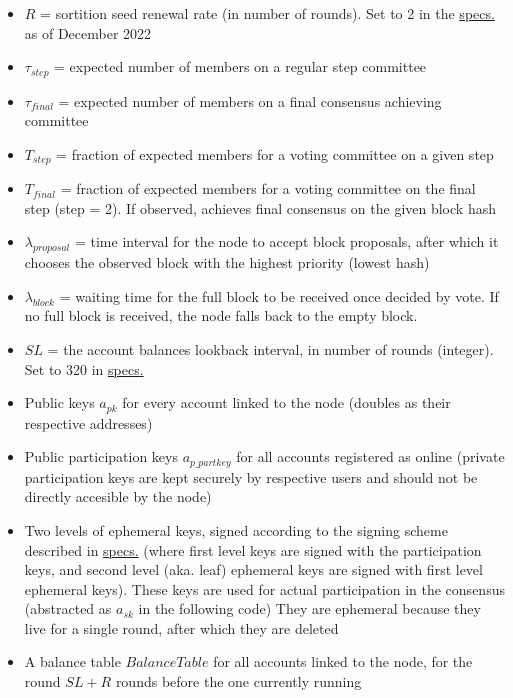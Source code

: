 \documentclass[10pt,a4paper]{article}
\begin{document}
\begin{itemize}
    \item $R$ = sortition seed renewal rate (in number of rounds). 
    Set to 2 in the \href{https://github.com/algorandfoundation/specs}{specs.}
    as of December 2022
    \item $\tau_{step}$ = expected number of members on a regular step committee
    \item $\tau_{final}$ = expected number of members on a final consensus achieving committee
    \item $T_{step}$ = fraction of expected members for a voting committee on a given step
    \item $T_{final}$ = fraction of expected members for a voting committee on the final step (step = 2). 
    If observed, achieves final consensus on the given block hash
    \item $\lambda_{proposal}$ = time interval for the node to accept block proposals, after
    which it chooses the observed block with the highest priority (lowest hash) 
    \item $\lambda_{block}$ = waiting time for the full block to be received once decided by vote.
    If no full block is received, the node falls back to the empty block.
    \item $SL$ = the account balances lookback interval, in number of rounds (integer). 
    Set to 320 in \href{https://github.com/algorandfoundation/specs}{specs.}
    \item Public keys $a_{pk}$ for every account linked to the node (doubles as their respective addresses)
    \item Public participation keys $a_{p\_partkey}$ for all accounts registered as online (private participation keys are kept
    securely by respective users and should not be directly accesible by the node)
    \item Two levels of ephemeral keys, signed according to the signing scheme described in \href{https://github.com/algorandfoundation/specs}{specs.} (where 
    first level keys are signed with the participation keys, and second level (aka. leaf) ephemeral keys are signed with 
    first level ephemeral keys). 
    These keys are used for actual participation in the consensus (abstracted as $a_{sk}$ in the following code)
    They are ephemeral because they live for a single round, after which they are deleted
    \item A balance table $BalanceTable$ for all accounts linked to the node, for the round $SL + R$ rounds before the one 
    currently running
\end{itemize}





\end{document}
